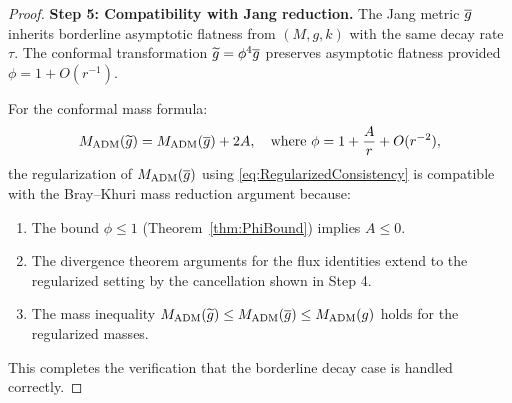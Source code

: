 \begin{proof}
\textbf{Step 5: Compatibility with Jang reduction.}
The Jang metric $\overline{g}$ inherits borderline asymptotic flatness from $(M, g, k)$ with the same decay rate $\tau$. The conformal transformation $\widetilde{g} = \phi^4 \overline{g}$ preserves asymptotic flatness provided $\phi = 1 + O(r^{-1})$.

For the conformal mass formula:
\begin{equation}
    M_{\mathrm{ADM}}(\widetilde{g}) = M_{\mathrm{ADM}}(\overline{g}) + 2A, \quad \text{where } \phi = 1 + \frac{A}{r} + O(r^{-2}),
\end{equation}
the regularization of $M_{\mathrm{ADM}}(\overline{g})$ using \eqref{eq:RegularizedConsistency} is compatible with the Bray--Khuri mass reduction argument because:
\begin{enumerate}
    \item The bound $\phi \le 1$ (Theorem~\ref{thm:PhiBound}) implies $A \le 0$.
    \item The divergence theorem arguments for the flux identities extend to the regularized setting by the cancellation shown in Step 4.
    \item The mass inequality $M_{\mathrm{ADM}}(\widetilde{g}) \le M_{\mathrm{ADM}}(\overline{g}) \le M_{\mathrm{ADM}}(g)$ holds for the regularized masses.
\end{enumerate}

This completes the verification that the borderline decay case is handled correctly.
\end{proof}

